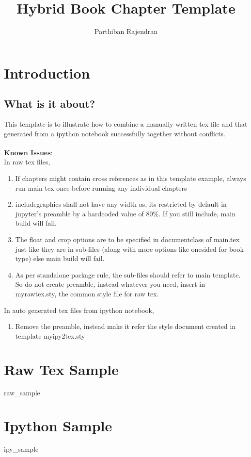 \documentclass[float=false, crop=false,11pt,oneside]{book}
\title{Hybrid Book Chapter Template}
\author{Parthiban Rajendran}
\begin{document}
    
    \maketitle 

    \tableofcontents

    \chapter{Introduction}
    \section{What is it about?}
    This template is to illustrate how to combine a manually written tex file and that 
    generated from a ipython notebook successfully together without conflicts. \\\\

    \textbf{Known Issues}:  \\

    In raw tex files, \\

    \begin{enumerate}
        \item If chapters might contain cross references as in this template example, always run main tex once before running any individual chapters
        \item includegraphics shall not have any width as, its restricted by default in jupyter's preamble by a hardcoded value of 80\%. If you still include, main build will fail.
        \item The float and crop options are to be specified in documentclass of main.tex just like they are in sub-files (along with more options like onesided for book type) else main build will fail. 
        \item As per standalone package rule, the sub-files should refer to main template. So do not create preamble, instead whatever you need, insert in myrawtex.sty, the common style file for raw tex.
    \end{enumerate}   
    
    In auto generated tex files from ipython notebook, \\
    
    \begin{enumerate}
        \item Remove the preamble, instead make it refer the style document created in template myipy2tex.sty 
    \end {enumerate}
   
    \chapter{Raw Tex Sample}
    {raw_sample} 
    
    \chapter{Ipython Sample}
	{ipy_sample}    
\end{document}
